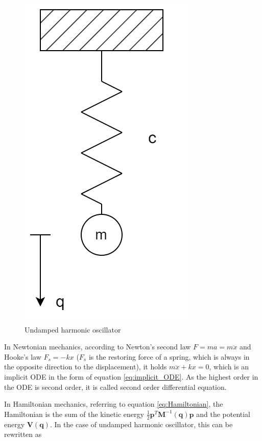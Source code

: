 \documentclass[
	parskip, 			   %
	twoside, 			   %
	DIV=14, 			   %
	BCOR=15.0mm, 		   %
	headsepline, 		   %
	open=right, 		   %
	captions=tableheading, %
	bibliography=totoc,    %
	numbers=noenddot       %
]{scrreprt}
\begin{document}
\clearpage
\begin{figure}[h!]
    \centering
    \includegraphics[scale=0.3]{figures/undamped harmonic oscillator.jpg}
    \caption{Undamped harmonic oscillator}
    \label{fig:physical_model_undamped_harmonic_oscillator}
\end{figure}

In Newtonian mechanics, according to Newton's second law $F=ma=m\ddot{x}$ and Hooke's law $F_s=-kx$ ($F_s$ is the restoring force of a spring, which is always in the opposite direction to the displacement), it holds $m\ddot{x}+kx=0$, which is an implicit ODE in the form of equation \ref{eq:implicit_ODE}. As the highest order in the ODE is second order, it is called second order differential equation.

In Hamiltonian mechanics, referring to equation \ref{eq:Hamiltonian}, the Hamiltonian is the sum of the kinetic energy $\frac{1}{2}\mathbf{p}^T\mathbf{M}^{-1}(\mathbf{q})\mathbf{p}$ and the potential energy $\mathbf{V}(\mathbf{q})$. In the case of undamped harmonic oscillator, this can be rewritten as
\end{document}
